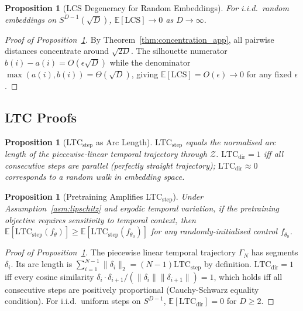 \documentclass[10pt]{article}
\newtheorem{proposition}[theorem]{Proposition}
\theoremstyle{definition}
\theoremstyle{remark}
\newcommand{\E}{\mathbb{E}}
\newcommand{\Zset}{\mathcal{Z}}
\newcommand{\norm}[1]{\lVert #1 \rVert}
\newcommand{\lcs}{\ensuremath{\mathrm{LCS}}}
\newcommand{\ltcstep}{\ensuremath{\mathrm{LTC}_{\mathrm{step}}}}
\newcommand{\ltcdir}{\ensuremath{\mathrm{LTC}_{\mathrm{dir}}}}
\begin{document}
\begin{proposition}[LCS Degeneracy for Random Embeddings]
\label{prop:lcs_degenerate}
For i.i.d.\ random embeddings on $S^{D-1}(\sqrt{D})$,
$\E[\lcs] \to 0$ as $D \to \infty$.
\end{proposition}

\begin{proof}[Proof of Proposition~\ref{prop:lcs_degenerate}]
By Theorem~\ref{thm:concentration_app}, all pairwise distances concentrate
around $\sqrt{2D}$.
The silhouette numerator $b(i)-a(i) = O(\epsilon\sqrt{D})$ while the
denominator $\max(a(i),b(i)) = \Theta(\sqrt{D})$, giving
$\E[\lcs] = O(\epsilon) \to 0$ for any fixed $\epsilon$.
\end{proof}

\subsection{LTC Proofs}
\label{app:ltc_proofs}

\begin{proposition}[LTC$_{\mathrm{step}}$ as Arc Length]
\label{prop:ltc_arc}
$\ltcstep$ equals the normalised arc length of the piecewise-linear temporal
trajectory through $\Zset$.
$\ltcdir = 1$ iff all consecutive steps are parallel (perfectly straight
trajectory); $\ltcdir \approx 0$ corresponds to a random walk in embedding space.
\end{proposition}

\begin{proposition}[Pretraining Amplifies LTC$_{\mathrm{step}}$]
\label{prop:ltc_pretraining}
Under Assumption~\ref{asm:lipschitz} and ergodic temporal variation,
if the pretraining objective requires sensitivity to temporal context, then
$\E[\ltcstep(f_\theta)] \geq \E[\ltcstep(f_{\theta_0})]$
for any randomly-initialised control $f_{\theta_0}$.
\end{proposition}

\begin{proof}[Proof of Proposition~\ref{prop:ltc_arc}]
The piecewise linear temporal trajectory $\Gamma_N$ has segments $\delta_i$.
Its arc length is $\sum_{i=1}^{N-1}\norm{\delta_i}_2 = (N-1)\ltcstep$ by
definition.
$\ltcdir = 1$ iff every cosine similarity $\delta_i\cdot\delta_{i+1}/
(\norm{\delta_i}\norm{\delta_{i+1}}) = 1$, which holds iff all consecutive
steps are positively proportional (Cauchy-Schwarz equality condition).
For i.i.d.\ uniform steps on $S^{D-1}$, $\E[\ltcdir] = 0$ for $D\geq 2$.
\end{proof}
\end{document}
